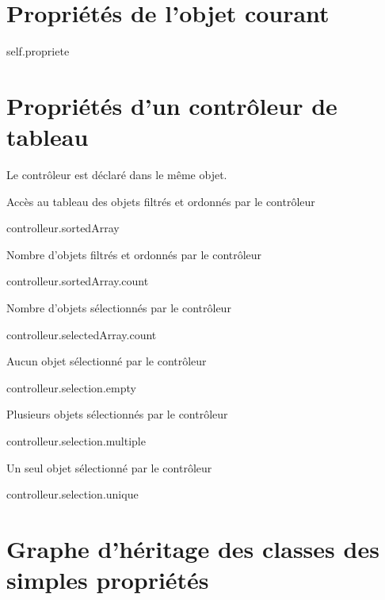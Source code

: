 



\section{Propriétés de l'objet courant}


\begin{ebcode}
self.propriete
\end{ebcode}



\section{Propriétés d'un contrôleur de tableau}

Le contrôleur est déclaré dans le même objet.

Accès au tableau des objets filtrés et ordonnés par le contrôleur
\begin{ebcode}
controlleur.sortedArray
\end{ebcode}

Nombre d'objets filtrés et ordonnés par le contrôleur
\begin{ebcode}
controlleur.sortedArray.count
\end{ebcode}

Nombre d'objets sélectionnés par le contrôleur
\begin{ebcode}
controlleur.selectedArray.count
\end{ebcode}

Aucun objet sélectionné par le contrôleur
\begin{ebcode}
controlleur.selection.empty
\end{ebcode}

Plusieurs objets sélectionnés par le contrôleur
\begin{ebcode}
controlleur.selection.multiple
\end{ebcode}

Un seul objet sélectionné par le contrôleur
\begin{ebcode}
controlleur.selection.unique
\end{ebcode}



\section{Graphe d'héritage des classes des simples propriétés}

